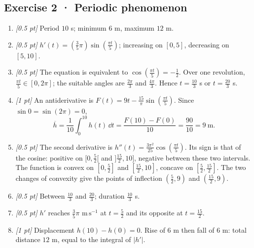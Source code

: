 \subsection*{Exercise 2 · Periodic phenomenon}\begin{enumerate}

\item \textit{[0.5 pt]} Period $10$ s; minimum $6$ m, maximum $12$ m.

\item \textit{[0.5 pt]} $h'(t)=(\frac{3}{5}\pi)\sin (\frac{\pi t}{5})$; increasing on $[0,5]$, decreasing on $[5,10]$.

\item \textit{[0.5 pt]} The equation is equivalent to $\cos (\frac{\pi t}{5})=-\frac{1}{2}$. Over one revolution, $\frac{\pi t}{5}\in[0,2\pi]$; the suitable angles are $\frac{2\pi}{3}$ and $\frac{4\pi}{3}$. Hence $t=\frac{10}{3}$ s or $t=\frac{20}{3}$ s.

\item \textit{[1 pt]} An antiderivative is $F(t)=9t-\frac{15}{\pi}\sin (\frac{\pi t}{5})$. Since $\sin0=\sin(2\pi)=0$,
\[\overline h=\frac{1}{10}\int_0^{10}h(t)\,\dd t=\frac{F(10)-F(0)}{10}=\frac{90}{10}=9\ \mathrm{m}.\]

\item \textit{[0.5 pt]} The second derivative is $h''(t)=\frac{3\pi^2}{25}\cos (\frac{\pi t}{5})$. Its sign is that of the cosine: positive on $[0,\frac{5}{2}[$ and $]\frac{15}{2},10]$, negative between these two intervals. The function is convex on $[0,\frac{5}{2}]$ and $[\frac{15}{2},10]$, concave on $[\frac{5}{2},\frac{15}{2}]$. The two changes of convexity give the points of inflection $(\frac{5}{2},9)$ and $(\frac{15}{2},9)$.

\item \textit{[0.5 pt]} Between $\frac{10}{3}$ and $\frac{20}{3}$; duration $\frac{10}{3}$ s.

\item \textit{[0.5 pt]} $h'$ reaches $\frac{3}{5}\pi$ $\mathrm{m\,s^{-1}}$ at $t=\frac{5}{2}$ and its opposite at $t=\frac{15}{2}$.

\item \textit{[1 pt]} Displacement $h(10)-h(0)=0$. Rise of $6$ m then fall of $6$ m: total distance $12$ m, equal to the integral of $|h'|$.

\end{enumerate}


